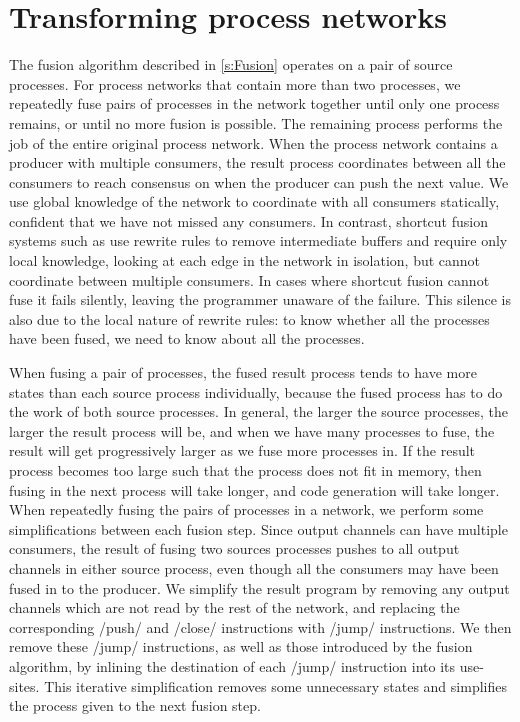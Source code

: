 \section{Transforming process networks}
\label{s:Optimisation}

The fusion algorithm described in \cref{s:Fusion} operates on a pair of source processes.
For process networks that contain more than two processes, we repeatedly fuse pairs of processes in the network together until only one process remains, or until no more fusion is possible.
The remaining process performs the job of the entire original process network.
When the process network contains a producer with multiple consumers, the result process coordinates between all the consumers to reach consensus on when the producer can push the next value.
We use global knowledge of the network to coordinate with all consumers statically, confident that we have not missed any consumers.
In contrast, shortcut fusion systems such as \cite{gill1993short} use rewrite rules to remove intermediate buffers and require only local knowledge, looking at each edge in the network in isolation, but cannot coordinate between multiple consumers.
In cases where shortcut fusion cannot fuse it fails silently, leaving the programmer unaware of the failure.
This silence is also due to the local nature of rewrite rules: to know whether all the processes have been fused, we need to know about all the processes.

When fusing a pair of processes, the fused result process tends to have more states than each source process individually, because the fused process has to do the work of both source processes.
In general, the larger the source processes, the larger the result process will be, and when we have many processes to fuse, the result will get progressively larger as we fuse more processes in.
If the result process becomes too large such that the process does not fit in memory, then fusing in the next process will take longer, and code generation will take longer.
When repeatedly fusing the pairs of processes in a network, we perform some simplifications between each fusion step.
Since output channels can have multiple consumers, the result of fusing two sources processes pushes to all output channels in either source process, even though all the consumers may have been fused in to the producer.
We simplify the result program by removing any output channels which are not read by the rest of the network, and replacing the corresponding \Hs/push/ and \Hs/close/ instructions with \Hs/jump/ instructions.
We then remove these \Hs/jump/ instructions, as well as those introduced by the fusion algorithm, by inlining the destination of each \Hs/jump/ instruction into its use-sites.
This iterative simplification removes some unnecessary states and simplifies the process given to the next fusion step.

